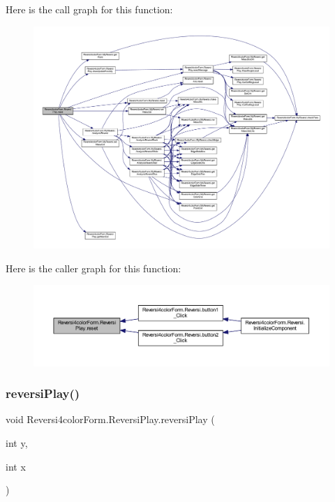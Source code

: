 Here is the call graph for this function\+:\nopagebreak
\begin{figure}[H]
\begin{center}
\leavevmode
\includegraphics[width=350pt]{class_reversi4color_form_1_1_reversi_play_a32c01f1f57a7413cd5173637800f74b7_cgraph}
\end{center}
\end{figure}
Here is the caller graph for this function\+:\nopagebreak
\begin{figure}[H]
\begin{center}
\leavevmode
\includegraphics[width=350pt]{class_reversi4color_form_1_1_reversi_play_a32c01f1f57a7413cd5173637800f74b7_icgraph}
\end{center}
\end{figure}
\mbox{\label{class_reversi4color_form_1_1_reversi_play_a88c4cd228512f02a940fbe147c9d75c3}} 
\subsubsection{\texorpdfstring{reversi\+Play()}{reversiPlay()}}
{\footnotesize\ttfamily void Reversi4color\+Form.\+Reversi\+Play.\+reversi\+Play (\begin{DoxyParamCaption}\item[{int}]{y,  }\item[{int}]{x }\end{DoxyParamCaption})}



